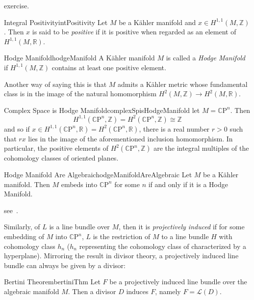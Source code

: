 \documentclass{book}
\newcommand{\R}{{\mathbb{R}}}
\newcommand{\Z}{{\mathbb{Z}}}
\newcommand{\CL}{{\mathcal{L}}}
\newcommand{\CP}{\mathbb{C}\mathrm{P}}
\begin{document}
\begin{Proof}
  exercise.
\end{Proof}

\begin{defn}{Integral Positivity}{intPositivity}
  Let $M$ be a K\"ahler manifold and $x \in H^{1,1}(M, \Z)$. Then $x$ is said to be \emph{positive} if it is
  positive when regarded as an element of $H^{1,1}(M, \R)$.
\end{defn}

\begin{defn}{Hodge Manifold}{hodgeManifold}
  A K\"ahler manifold $M$ is called a \emph{Hodge Manifold} if $H^{1,1}(M, \Z)$ contains at least one positive
  element.
\end{defn}

Another way of saying this is that $M$ admits a K\"ahler metric whose fundamental class is in the image of the
natural homomorphism $H^2(M, \Z) \to H^2(M, \R)$.

\begin{example}{Complex Space is Hodge Manifold}{complexSpisHodgeManifold}
  let $M = \CP^n$. Then
  \[
    H^{1,1}(\CP^n, \Z) = H^2(\CP^n, \Z) \cong \Z
  \]
  and so if $x \in H^{1,1}(\CP^n, \R) = H^2(\CP^n, \R)$, there is a real number $r > 0$ such that $rx$ lies in
  the image of the aforementioned inclusion homomorphism. In particular, the positive elements of $H^2(\CP^n,
  \Z)$ are the integral multiples of the cohomology classes of oriented planes.
\end{example}

\begin{thm}{Hodge Manifold Are Algebraic}{hodgeManifoldAreAlgebraic}
  Let $M$ be a K\"ahler manifold. Then $M$ embeds into $\CP^n$ for some $n$ if and only if it is a Hodge
  Manifold.
\end{thm}

\begin{Proof}
  see~\cite{voisinHodgeTheoryComplex2002}.
\end{Proof}

Similarly, of $L$ is a line bundle over $M$, then it is \emph{projectively induced} if for some embedding of
$M$ into $\CP^n$, $L$ is the restriction of $M$ to a line bundle $H$ with cohomology class $h_n$ ($h_n$
representing the cohomology class of characterized by a hyperplane). Mirroring the result in divisor theory,
a projectively induced line bundle can always be given by a divisor:


\begin{thm}{Bertini Theorem}{bertiniThm}
  Let $F$ be a projectively induced line bundle over the algebraic manifold $M$. Then a divisor
  $D$ induces $F$, namely $F = \CL(D)$.
\end{thm}
\end{document}
